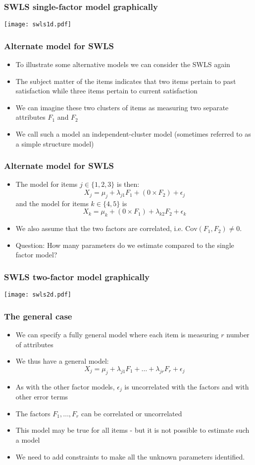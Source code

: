 \documentclass[compress]{beamer}
\begin{document}
\begin{frame}[fragile]
\frametitle{SWLS single-factor model graphically}
\texttt{[image: swls1d.pdf]}
\end{frame}

\begin{frame}[fragile]
\frametitle{Alternate model for SWLS}
\begin{itemize}
\item To illustrate some alternative models we can consider the SWLS again
\item The subject matter of the items indicates that two items pertain to past satisfaction while three items pertain to current satisfaction
\item We can imagine these two clusters of items as measuring two separate attributes $F_1$ and $F_2$
\item We call such a model an independent-cluster model (sometimes referred to as a simple structure model)
\end{itemize}
\end{frame}

\begin{frame}[fragile]
\frametitle{Alternate model for SWLS}
\begin{itemize}
\item The model for items $j \in \{1, 2, 3\}$ is then:
\[
X_j = \mu_j + \lambda_{j1} F_1 + (0 \times F_2) + \epsilon_j
\]
and the model for items $k \in \{4, 5\}$ is
\[
X_k = \mu_k + (0 \times F_1) + \lambda_{k2} F_2 + \epsilon_k
\]
\item We also assume that the two factors are correlated, i.e. $\text{Cov}(F_1, F_2) \neq 0$.
\item Question: How many parameters do we estimate compared to the single factor model?
\end{itemize}
\end{frame}

\begin{frame}[fragile]
\frametitle{SWLS two-factor model graphically}
\texttt{[image: swls2d.pdf]}
\end{frame}


\begin{frame}[fragile]
\frametitle{The general case}
\begin{itemize}
\item We can specify a fully general model where each item is measuring $r$ number of attributes
\item We thus have a general model:
\[
X_j = \mu_j + \lambda_{j1} F_{1} + \dots + \lambda_{jr}F_r + \epsilon_j 
\]
\item As with the other factor models, $\epsilon_j$ is uncorrelated with the factors and with other error terms
\item The factors $F_1, \dots, F_r$ can be correlated or uncorrelated
\item This model may be true for all items - but it is not possible to estimate such a model
\item We need to add constraints to make all the unknown parameters identified.
\end{itemize}
\end{frame}
\end{document}
